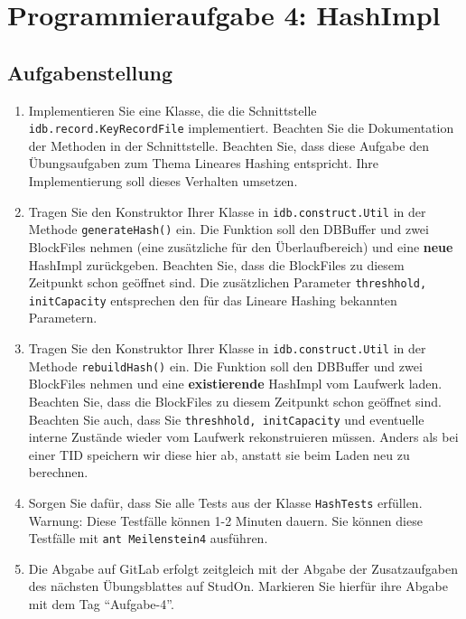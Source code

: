 \section{Programmieraufgabe 4: HashImpl}

\subsection{Aufgabenstellung}
\begin{enumerate}
	\item Implementieren Sie eine Klasse, die die Schnittstelle \beamertxt{\linebreak}\texttt{idb.record.KeyRecordFile} implementiert.
		Beachten Sie die Dokumentation der Methoden in der Schnittstelle. Beachten Sie, dass diese Aufgabe den Übungsaufgaben zum Thema Lineares Hashing entspricht.
		Ihre Implementierung soll dieses Verhalten umsetzen.
	\item Tragen Sie den Konstruktor Ihrer Klasse in \texttt{idb.construct.Util} in der Methode \texttt{generateHash()} ein.
		Die Funktion soll den DBBuffer und zwei BlockFiles nehmen (eine zusätzliche für den Überlaufbereich) und eine \textbf{neue} HashImpl zurückgeben.
		Beachten Sie, dass die BlockFiles zu diesem Zeitpunkt schon geöffnet sind.
		Die zusätzlichen Parameter \texttt{threshhold, initCapacity} entsprechen den für das Lineare Hashing bekannten Parametern.
	\item Tragen Sie den Konstruktor Ihrer Klasse in \texttt{idb.construct.Util} in der Methode \texttt{rebuildHash()} ein.
		Die Funktion soll den DBBuffer und zwei BlockFiles nehmen und eine \textbf{existierende} HashImpl vom Laufwerk laden.
		Beachten Sie, dass die BlockFiles zu diesem Zeitpunkt schon geöffnet sind.
		Beachten Sie auch, dass Sie \texttt{threshhold, initCapacity} und eventuelle interne Zustände wieder vom Laufwerk rekonstruieren müssen.
		Anders als bei einer TID speichern wir diese hier ab, anstatt sie beim Laden neu zu berechnen.
	\item Sorgen Sie dafür, dass Sie alle Tests aus der Klasse \texttt{HashTests} erfüllen. Warnung: Diese Testfälle können 1-2 Minuten dauern.
	Sie können diese Testfälle mit \lstinline|ant Meilenstein4| ausführen.
	\item Die Abgabe auf GitLab erfolgt zeitgleich mit der Abgabe der Zusatzaufgaben des nächsten Übungsblattes auf StudOn. Markieren Sie hierfür ihre Abgabe mit dem Tag "`Aufgabe-4"'.
\end{enumerate}


